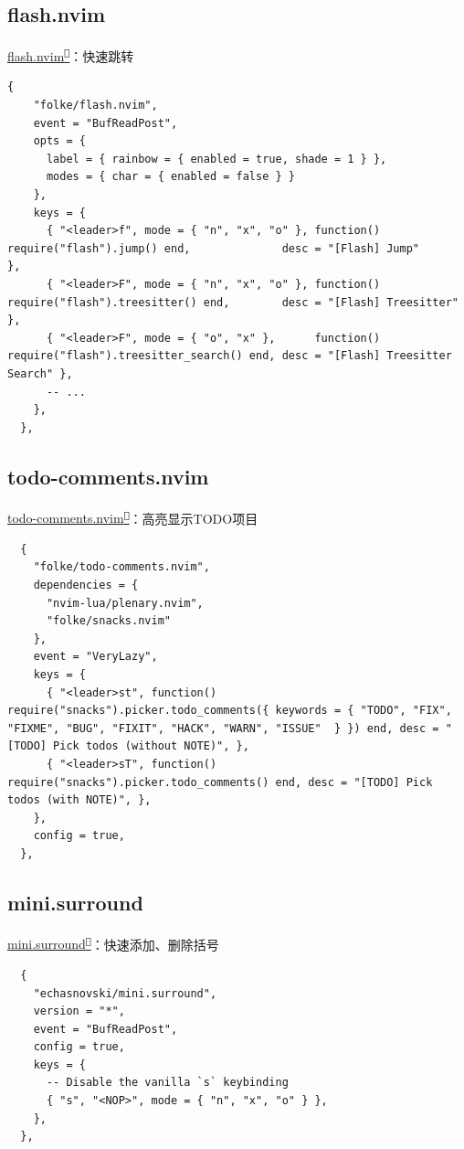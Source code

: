 \documentclass[aspectratio=169]{ctexbeamer}
\newcommand{\nerd}[1]{\texttt{#1}}
\newcommand{\link}[3][]{\href{#3}{#2\textsuperscript{\nerd{}}}}
\begin{document}
  \subsection{flash.nvim}
    \begin{frame}[fragile]{\link{flash.nvim}{https://github.com/folke/flash.nvim}：快速跳转}

      \begin{lstlisting}[basicstyle=\tiny\ttfamily]
  {
    "folke/flash.nvim",
    event = "BufReadPost",
    opts = {
      label = { rainbow = { enabled = true, shade = 1 } },
      modes = { char = { enabled = false } }
    },
    keys = {
      { "<leader>f", mode = { "n", "x", "o" }, function() require("flash").jump() end,              desc = "[Flash] Jump"              },
      { "<leader>F", mode = { "n", "x", "o" }, function() require("flash").treesitter() end,        desc = "[Flash] Treesitter"        },
      { "<leader>F", mode = { "o", "x" },      function() require("flash").treesitter_search() end, desc = "[Flash] Treesitter Search" },
      -- ...
    },
  },
      \end{lstlisting}

    \end{frame}

  \subsection{todo-comments.nvim}
    \begin{frame}[fragile]{\link{todo-comments.nvim}{https://github.com/folke/todo-comments.nvim}：高亮显示TODO项目}

      \begin{lstlisting}
  {
    "folke/todo-comments.nvim",
    dependencies = {
      "nvim-lua/plenary.nvim",
      "folke/snacks.nvim"
    },
    event = "VeryLazy",
    keys = {
      { "<leader>st", function() require("snacks").picker.todo_comments({ keywords = { "TODO", "FIX", "FIXME", "BUG", "FIXIT", "HACK", "WARN", "ISSUE"  } }) end, desc = "[TODO] Pick todos (without NOTE)", },
      { "<leader>sT", function() require("snacks").picker.todo_comments() end, desc = "[TODO] Pick todos (with NOTE)", },
    },
    config = true,
  },

      \end{lstlisting}

    \end{frame}

  \subsection{mini.surround}
    \begin{frame}[fragile]{\link{mini.surround}{https://github.com/echasnovski/mini.surround}：快速添加、删除括号}

      \begin{lstlisting}
  {
    "echasnovski/mini.surround",
    version = "*",
    event = "BufReadPost",
    config = true,
    keys = {
      -- Disable the vanilla `s` keybinding
      { "s", "<NOP>", mode = { "n", "x", "o" } },
    },
  },
      \end{lstlisting}
    \end{frame}
\end{document}
